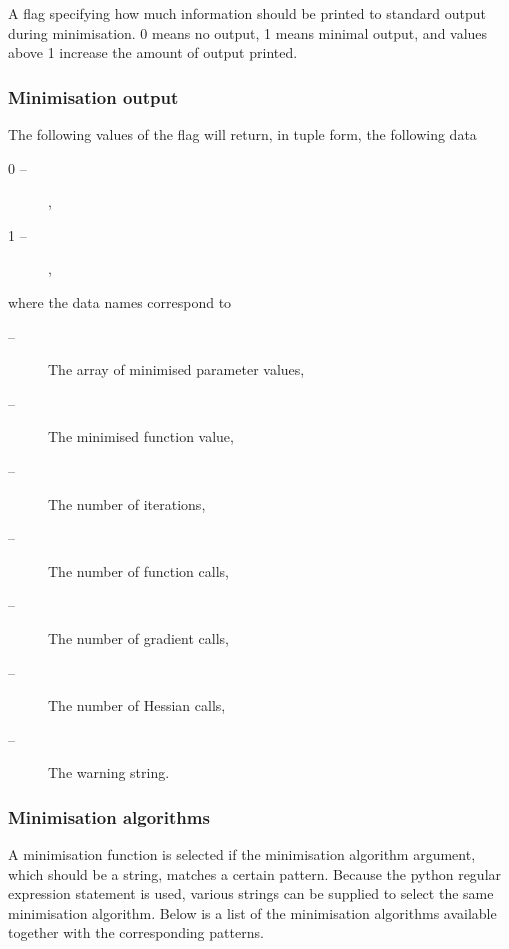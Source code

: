    A flag specifying how much information should be printed to standard output during minimisation.  0 means no output, 1 means minimal output, and values above 1 increase the amount of output printed.  

  

  
 \subsubsection{Minimisation output} 

 The following values of the  flag will return, in tuple form, the following data 
  

 \begin{description} 
 \item[0 --]  ,  
 \item[1 --]  ,  
 \end{description} 
  

 where the data names correspond to 
  

 \begin{description} 
 \item[ --]      The array of minimised parameter values,  
 \item[ --]      The minimised function value,  
 \item[ --]       The number of iterations,  
 \item[ --] The number of function calls,  
 \item[ --] The number of gradient calls,  
 \item[ --] The number of Hessian calls,  
 \item[ --] The warning string.  
 \end{description} 
  

  
 \subsubsection{Minimisation algorithms} 

 A minimisation function is selected if the minimisation algorithm argument, which should be a string, matches a certain pattern.  Because the python regular expression  statement is used, various strings can be supplied to select the same minimisation algorithm.  Below is a list of the minimisation algorithms available together with the corresponding patterns. 
  

